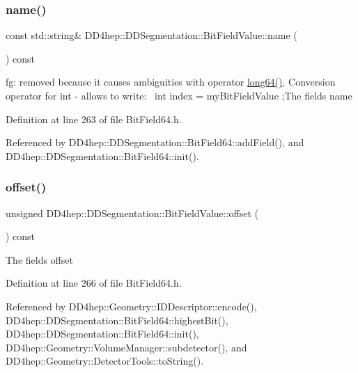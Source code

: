 \subsubsection{\texorpdfstring{name()}{name()}}
{\footnotesize\ttfamily const std\+::string\& D\+D4hep\+::\+D\+D\+Segmentation\+::\+Bit\+Field\+Value\+::name (\begin{DoxyParamCaption}{ }\end{DoxyParamCaption}) const\hspace{0.3cm}{\ttfamily [inline]}}

fg\+: removed because it causes ambiguities with operator \hyperlink{namespace_d_d4hep_ac2a70e722b33dc7ddaa20db8954ac836}{long64()}. Conversion operator for int -\/ allows to write\+:~\newline
 int index = my\+Bit\+Field\+Value ;The field\textquotesingle{}s name 

Definition at line 263 of file Bit\+Field64.\+h.



Referenced by D\+D4hep\+::\+D\+D\+Segmentation\+::\+Bit\+Field64\+::add\+Field(), and D\+D4hep\+::\+D\+D\+Segmentation\+::\+Bit\+Field64\+::init().

\hypertarget{class_d_d4hep_1_1_d_d_segmentation_1_1_bit_field_value_ab8aa1a30c457ac06641276a2e10e647d}{}\label{class_d_d4hep_1_1_d_d_segmentation_1_1_bit_field_value_ab8aa1a30c457ac06641276a2e10e647d} 
\subsubsection{\texorpdfstring{offset()}{offset()}}
{\footnotesize\ttfamily unsigned D\+D4hep\+::\+D\+D\+Segmentation\+::\+Bit\+Field\+Value\+::offset (\begin{DoxyParamCaption}{ }\end{DoxyParamCaption}) const\hspace{0.3cm}{\ttfamily [inline]}}

The field\textquotesingle{}s offset 

Definition at line 266 of file Bit\+Field64.\+h.



Referenced by D\+D4hep\+::\+Geometry\+::\+I\+D\+Descriptor\+::encode(), D\+D4hep\+::\+D\+D\+Segmentation\+::\+Bit\+Field64\+::highest\+Bit(), D\+D4hep\+::\+D\+D\+Segmentation\+::\+Bit\+Field64\+::init(), D\+D4hep\+::\+Geometry\+::\+Volume\+Manager\+::subdetector(), and D\+D4hep\+::\+Geometry\+::\+Detector\+Tools\+::to\+String().


